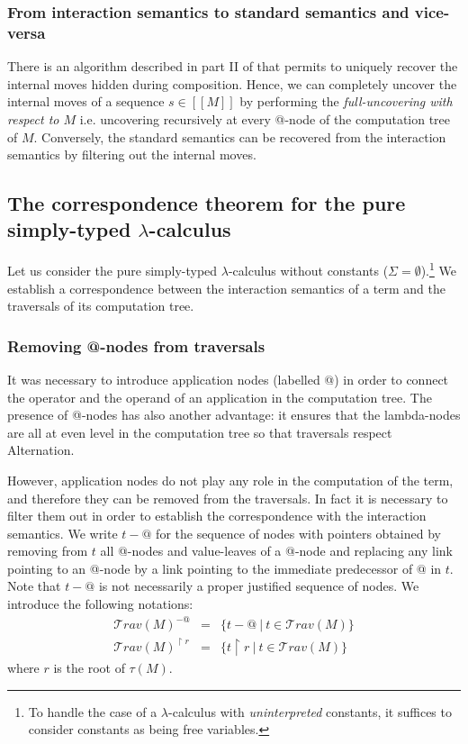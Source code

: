 \documentclass{llncs}
\newcommand\travset{\mathcal{T}rav}
\newcommand{\lsem}{[\![} %
\newcommand{\rsem}{]\!]} %
\newcommand{\sem}[1]{{\lsem #1 \rsem}}
\begin{document}
\subsubsection{From interaction semantics to standard semantics and vice-versa}

There is an algorithm described in part II of \cite{hylandong_pcf} that permits
to uniquely recover the internal moves hidden during composition. Hence, we can completely uncover the internal moves of a sequence $s\in\sem{M}$ by performing the \emph{full-uncovering with respect to $M$} i.e. uncovering recursively at every @-node of the computation tree of $M$.
Conversely, the standard semantics can be recovered from the
interaction semantics by filtering out the internal moves.


\subsection{The correspondence theorem for the pure simply-typed $\lambda$-calculus}

Let us consider the pure simply-typed $\lambda$-calculus without constants ($\Sigma = \emptyset$).\footnote{To handle the case of a $\lambda$-calculus with \emph{uninterpreted} constants, it suffices to
consider constants as being free variables.}
We establish a correspondence between the interaction semantics of a term
and the traversals of its computation tree.

\subsubsection{Removing @-nodes from traversals}

It was necessary to introduce application nodes (labelled @) in order to connect the operator and
the operand of an application in the computation tree. The presence of @-nodes has also
another advantage: it ensures that the lambda-nodes are all at even
level in the computation tree so that traversals respect Alternation.

However, application nodes do not play any role in the computation of the term, and therefore
they can be removed from the traversals. In fact it is
necessary to filter them out in order to establish the
correspondence with the interaction semantics.
We write $t-@$ for the sequence of nodes with pointers obtained by
removing from $t$ all @-nodes and value-leaves of a @-node and
replacing any link pointing to an @-node by a link pointing to the immediate predecessor of @ in $t$.
Note that $t-@$ is not necessarily a proper justified sequence of nodes.
We introduce the following notations:
\begin{eqnarray*}
\travset(M)^{-@} &=& \{ t - @ \ | \  t \in \travset(M) \} \\
\travset(M)^{\upharpoonright r} &=& \{ t  \upharpoonright r \ | \  t  \in \travset(M) \}
\end{eqnarray*}
where $r$ is the root of $\tau(M)$.
\end{document}
